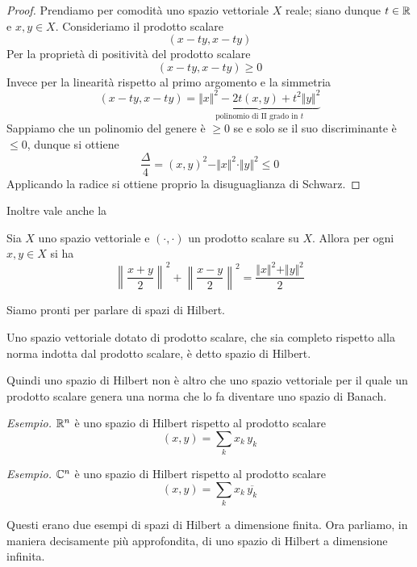 \begin{proof}
Prendiamo per comodità uno spazio vettoriale $X$ reale; siano dunque $t\in\mathbb{R}$ e $x,y\in X$. Consideriamo il prodotto scalare
$$
(x-ty,x-ty)
$$
Per la proprietà di positività del prodotto scalare
$$
(x-ty,x-ty)\geq0
$$
Invece per la linearità rispetto al primo argomento e la simmetria
$$
(x-ty,x-ty)=\underbrace{\Vert x\Vert^2-2t(x,y)+t^2\Vert y\Vert^2}_{\text{polinomio di II grado in }t}
$$
Sappiamo che un polinomio del genere è $\geq 0$ se e solo se il suo discriminante è $\leq 0$, dunque si ottiene
$$
\frac{\Delta}{4}=(x,y)^2-\Vert x\Vert^2 \cdot \Vert y \Vert^2\leq 0
$$
Applicando la radice si ottiene proprio la disuguaglianza di Schwarz.
\end{proof}

Inoltre vale anche la
\begin{thm}
Sia $X$ uno spazio vettoriale e $(\cdot,\cdot)$ un prodotto scalare su $X$. Allora per ogni $x,y\in X$ si ha
\begin{equation*}
\left\|\frac{x+y}{2}\right\|^2+\left\|\frac{x-y}{2}\right\|^2=\frac{\Vert x\Vert^2 + \Vert y \Vert^2}{2}
\end{equation*}
\end{thm}

Siamo pronti per parlare di spazi di Hilbert.

\begin{defn}
Uno spazio vettoriale dotato di prodotto scalare, che sia completo rispetto alla norma indotta dal prodotto scalare, è detto spazio di Hilbert.
\end{defn}
Quindi uno spazio di Hilbert non è altro che uno spazio vettoriale per il quale un prodotto scalare genera una norma che lo fa diventare uno spazio di Banach.

\textit{Esempio.} 
$\mathbb{R}^n$ è uno spazio di Hilbert rispetto al prodotto scalare
\begin{equation*}
(x,y)=\sum_k x_k\, y_k
\end{equation*}

\textit{Esempio.} 
$\mathbb{C}^n$ è uno spazio di Hilbert rispetto al prodotto scalare
\begin{equation*}
(x,y)=\sum_k x_k\, \overline{y_k}
\end{equation*}

Questi erano due esempi di spazi di Hilbert a dimensione finita. Ora parliamo, in maniera decisamente più approfondita, di uno spazio di Hilbert a dimensione infinita.

